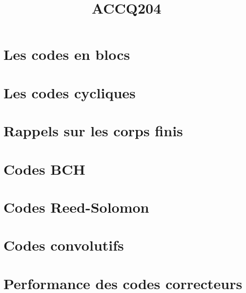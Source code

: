 \documentclass[a4paper,9pt]{article}
\title{\vspace{-1.2cm} \textbf{ACCQ204}}
\begin{document}
\maketitle

\vspace{-1.5cm}

\section{Les codes en blocs}

	

\section{Les codes cycliques}

	

\section{Rappels sur les corps finis}

	

\section{Codes BCH}

	

\section{Codes Reed-Solomon}

	

\section{Codes convolutifs}

	

\section{Performance des codes correcteurs}

	
\end{document}
